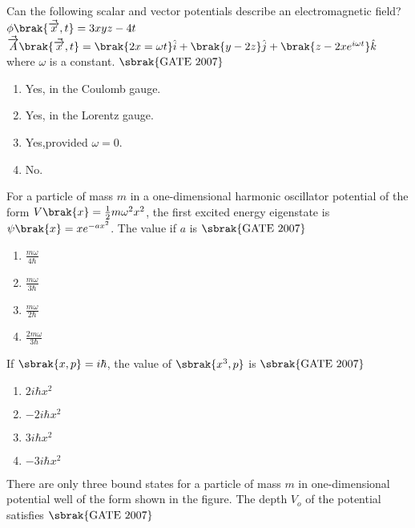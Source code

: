 \item Can the following scalar and vector potentials describe an electromagnetic field? \\
$\phi\brak{\Vec{\overrightarrow{x}},t}=3xyz-4t$\\
$\Vec{\overrightarrow{A}}\brak{\Vec{\overrightarrow{x}},t}= \brak{2x=\omega t}\hat{i}+\brak{y-2z}\hat{j}+\brak{z-2xe^{i\omega t}}\hat{k}$\\
where $\omega$ is a constant.
\hfill{$\sbrak{\text{GATE 2007}}$} \begin{multicols}{2}
\begin{enumerate}
    \item Yes, in the Coulomb gauge.
    \item Yes, in the Lorentz gauge.
    \item Yes,provided $\omega = 0$.
    \item No.
    
\end{enumerate}
\end{multicols}
\item For a particle of mass $m$ in a one-dimensional harmonic oscillator potential of the form $V\brak{x}=\frac{1}{2}m\omega^2x^2$, the first excited energy eigenstate is $\psi\brak{x} = xe^{-ax^2}$. The value if $a$ is \hfill{$\sbrak{\text{GATE 2007}}$} \begin{multicols}{4}    
\begin{enumerate}
    \item $\frac{m\omega}{4\hbar}$
    \item $\frac{m\omega}{3\hbar}$
    \item $\frac{m\omega}{2\hbar}$
    \item $\frac{2m\omega}{3\hbar}$
\end{enumerate}
\end{multicols}
\item If $\sbrak{x,p}=i\hbar$, the value of $\sbrak{x^3,p}$ is \hfill{$\sbrak{\text{GATE 2007}}$} 
\begin{multicols}{4}
\begin{enumerate}
    \item $2i\hbar x^2$
    \item $-2i\hbar x^2$
    \item $3i\hbar x^2$
    \item $-3i\hbar x^2$
    
\end{enumerate}
\end{multicols}
\item There are only three bound states for a particle of mass $m$ in one-dimensional potential well of the form shown in the figure. The depth $V_o$ of the potential satisfies 
\hfill{$\sbrak{\text{GATE 2007}}$} 



